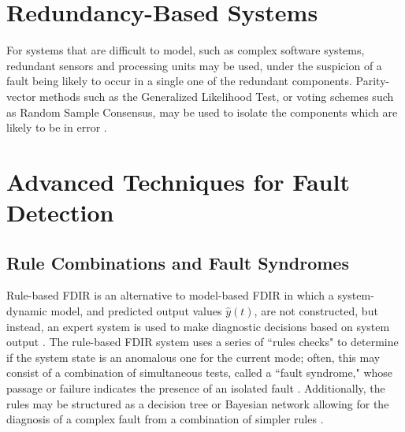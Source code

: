 




\section{Redundancy-Based Systems}

For systems that are difficult to model, such as complex software systems, redundant sensors and processing units may be used, under the suspicion of a fault being likely to occur in a single one of the redundant components. Parity-vector methods such as the Generalized Likelihood Test, or voting schemes such as Random Sample Consensus, may be used to isolate the components which are likely to be in error \cite{holsti2001towards}.

\section{Advanced Techniques for Fault Detection}

\subsection{Rule Combinations and Fault Syndromes}

Rule-based FDIR is an alternative to model-based FDIR in which a system-dynamic model, and predicted output values $\hat{y}(t)$, are not constructed, but instead, an expert system is used to make diagnostic decisions based on system output \cite{schwabacher2008pre}. The rule-based FDIR system uses a series of ``rules checks" to determine if the system state is an anomalous one for the current mode; often, this may consist of a combination of simultaneous tests, called a ``fault syndrome," whose passage or failure indicates the presence of an isolated fault \cite{hammett1991application}. Additionally, the rules may be structured as a decision tree or Bayesian network allowing for the diagnosis of a complex fault from a combination of simpler rules \cite{holsti2001towards} \cite{paakko2001bayesian}.

